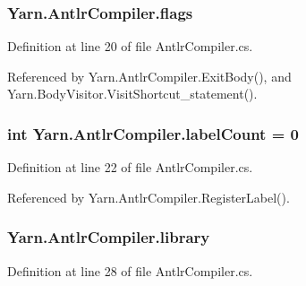 \hypertarget{a00038_aeba873449ff9fb1c6d731ff7eb25f0a0}{
\subsubsection[{flags}]{ Yarn.\-Antlr\-Compiler.\-flags\hspace{0.3cm}{\ttfamily [package]}}}\label{a00038_aeba873449ff9fb1c6d731ff7eb25f0a0}


Definition at line 20 of file Antlr\-Compiler.\-cs.



Referenced by Yarn.\-Antlr\-Compiler.\-Exit\-Body(), and Yarn.\-Body\-Visitor.\-Visit\-Shortcut\-\_\-statement().

\hypertarget{a00038_acf45ec9d1c6301f1798b2722f6e14ddf}{
\subsubsection[{label\-Count}]{\setlength{\rightskip}{0pt plus 5cm}int Yarn.\-Antlr\-Compiler.\-label\-Count = 0\hspace{0.3cm}{\ttfamily [private]}}}\label{a00038_acf45ec9d1c6301f1798b2722f6e14ddf}


Definition at line 22 of file Antlr\-Compiler.\-cs.



Referenced by Yarn.\-Antlr\-Compiler.\-Register\-Label().

\hypertarget{a00038_ab324c10fd8e6a786d97a9e5d65547820}{
\subsubsection[{library}]{ Yarn.\-Antlr\-Compiler.\-library\hspace{0.3cm}{\ttfamily [package]}}}\label{a00038_ab324c10fd8e6a786d97a9e5d65547820}


Definition at line 28 of file Antlr\-Compiler.\-cs.



